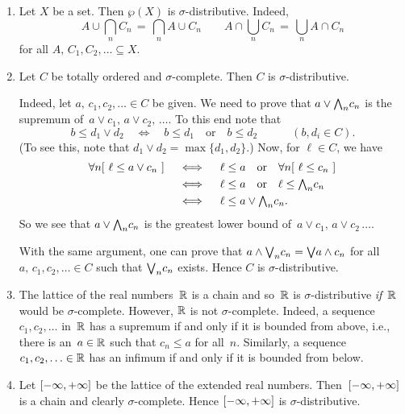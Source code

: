 \documentclass[main.tex]{subfiles}
\begin{document}
\begin{exs}
\label{E:sigma-distributive}
\begin{enumerate}
\item
\label{E:sigma-distributive-sets}
Let $X$ be a set. Then $\wp(X)$ is $\sigma$-distributive.
Indeed,  
\begin{equation*}
\textstyle{
A \cup \bigcap_n C_n \,=\, \bigcap_n A \cup C_n
\qquad
A\cap \bigcup_n C_n \,=\, \bigcup_n A \cap C_n}
\end{equation*}
for all $A,\, C_1,C_2,\dotsc \subseteq X$.
\item
Let $C$ be totally ordered
and $\sigma$-complete. Then $C$ is $\sigma$-distributive.

Indeed,
let $a,\,c_1,c_2,\dotsc \in C$ be given.
We need to prove that $a \vee \textstyle{\bigwedge}_n c_n$
is the supremum of~$a\vee c_1,\,a\vee c_2,\,\dotsc$.
To this end note that 
\begin{equation*}
b \leq d_1 \vee d_2 \quad\iff\quad 
b\leq d_1\quad\text{or}\quad b\leq d_2
\qquad\quad(b,d_i\in C).
\end{equation*}
(To see this, note that $d_1 \vee d_2 = \max\{d_1,d_2\}$.)
Now, for $\ell \in C$, we have
\begin{alignat*}{3}
\forall n [\ \ell \leq a \vee c_n \ ]
\quad&\iff\quad
\ell \leq a
    \quad\text{or}\quad
    \forall n[\ \ell \leq c_n\ ] \\
\quad&\iff\quad
\ell \leq a
    \quad\text{or}\quad
    \ell \leq \textstyle{\bigwedge}_n c_n \\
\quad&\iff\quad
\ell \leq a\vee \textstyle{\bigwedge}_n c_n.
\end{alignat*}
So we see 
that $a\vee\textstyle{\bigwedge}_n c_n$ is the greatest 
lower bound of~$a\vee c_1,\,a\vee c_2\,\dotsc$.

With the same argument,
one can prove that $a \wedge \textstyle{\bigvee}_n c_n = \textstyle{\bigvee} a \wedge c_n$
for all $a,\,c_1,c_2,\dotsc \in C$
such that $\textstyle{\bigvee}_n c_n$ exists.
Hence $C$ is $\sigma$-distributive.

\item
The lattice of the real numbers~$\mathbb{R}$ is a chain
and so~$\mathbb{R}$ is $\sigma$-distributive
\emph{if}~$\mathbb{R}$ would be $\sigma$-complete.
However,
$\mathbb{R}$ is not $\sigma$-complete.
Indeed,
a sequence $c_1,c_2,\dotsc$ in~$\mathbb{R}$ has a supremum
if and only if it is bounded from above,
i.e., there is an~$a\in \mathbb{R}$ such that $c_n \leq a$
for all~$n$.
Similarly,
a sequence
$c_1,c_2,\dotsc\in \mathbb{R}$ has an infimum
if and only if it is bounded from below.

\item
Let ${[-\infty,+\infty]}$ be the lattice of the extended real numbers.
Then~${[-\infty,+\infty]}$ is a chain and clearly $\sigma$-complete.
Hence ${[-\infty,+\infty]}$ is $\sigma$-distributive.


\end{enumerate}
\end{exs}
\end{document}
